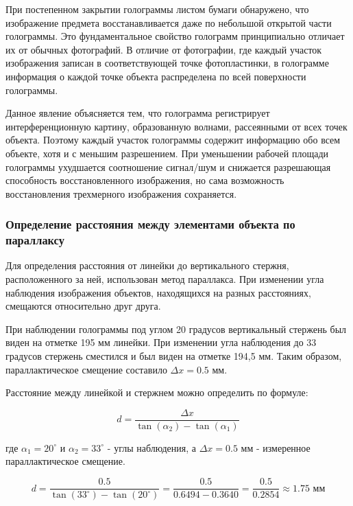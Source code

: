 При постепенном закрытии голограммы листом бумаги обнаружено, что изображение предмета восстанавливается даже по небольшой открытой части голограммы. Это фундаментальное свойство голограмм принципиально отличает их от обычных фотографий. В отличие от фотографии, где каждый участок изображения записан в соответствующей точке фотопластинки, в голограмме информация о каждой точке объекта распределена по всей поверхности голограммы.

Данное явление объясняется тем, что голограмма регистрирует интерференционную картину, образованную волнами, рассеянными от всех точек объекта. Поэтому каждый участок голограммы содержит информацию обо всем объекте, хотя и с меньшим разрешением. При уменьшении рабочей площади голограммы ухудшается соотношение сигнал/шум и снижается разрешающая способность восстановленного изображения, но сама возможность восстановления трехмерного изображения сохраняется.

\subsubsection{Определение расстояния между элементами объекта по параллаксу}

Для определения расстояния от линейки до вертикального стержня, расположенного за ней, использован метод параллакса. При изменении угла наблюдения изображения объектов, находящихся на разных расстояниях, смещаются относительно друг друга.

При наблюдении голограммы под углом 20 градусов вертикальный стержень был виден на отметке 195 мм линейки. При изменении угла наблюдения до 33 градусов стержень сместился и был виден на отметке 194,5 мм. Таким образом, параллактическое смещение составило $\Delta x = 0.5$ мм.

Расстояние между линейкой и стержнем можно определить по формуле:

\begin{equation}
    d = \frac{\Delta x}{\tan(\alpha_2) - \tan(\alpha_1)}
\end{equation}

где $\alpha_1 = 20^{\circ}$ и $\alpha_2 = 33^{\circ}$ - углы наблюдения, а $\Delta x = 0.5$ мм - измеренное параллактическое смещение.

\begin{equation}
    d = \frac{0.5}{\tan(33^{\circ}) - \tan(20^{\circ})} = \frac{0.5}{0.6494 - 0.3640} = \frac{0.5}{0.2854} \approx 1.75 \text{ мм}
\end{equation}

